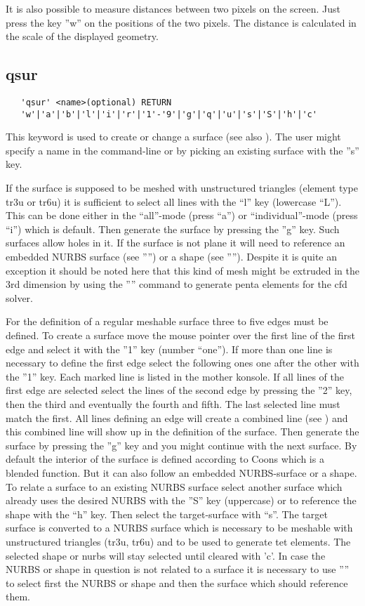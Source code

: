 \documentclass{article}
\begin{document}
It is also possible to measure distances between two pixels on the screen. Just press the key ''w'' on the positions of the two pixels. The distance is calculated in the scale of the displayed geometry.

\subsection{\label{qsur}qsur}
\begin{verbatim}
   'qsur' <name>(optional) RETURN
   'w'|'a'|'b'|'l'|'i'|'r'|'1'-'9'|'g'|'q'|'u'|'s'|'S'|'h'|'c'
\end{verbatim}
This keyword is used to create or change a surface (see also ). The user might specify a name in the command-line or by picking an existing surface with the ''s'' key.

If the surface is supposed to be meshed with unstructured triangles (element type tr3u or tr6u) it is sufficient to select all lines with the ``l'' key (lowercase ``L''). This can be done either in the ``all''-mode (press ``a'') or ``individual''-mode (press ``i'') which is default. Then generate the surface by pressing the ''g'' key. Such surfaces allow holes in it. If the surface is not plane it will need to reference an embedded NURBS surface (see '''') or a shape (see ''''). Despite it is quite an exception it should be noted here that this kind of mesh might be extruded in the 3rd dimension by using the '''' command to generate penta elements for the cfd solver.

For the definition of a regular meshable surface three to five edges must be
defined. To create a surface move the mouse pointer over the first line of the
first edge and select it with the ''1'' key (number ``one''). If more than one
line is necessary to define the first edge select the following ones one after
the other with the ''1'' key. Each marked line is listed in the mother
konsole. If all lines of the first edge are selected select the lines of the
second edge by pressing the ''2'' key, then the third and eventually the
fourth and fifth. The last selected line must match the first. All lines
defining an edge will create a combined line (see ) and
this combined line will show up in the definition of the surface. Then
generate the surface by pressing the ''g'' key and you might continue with the
next surface. By default the interior of the surface is defined according to
Coons \cite{Coons} which is a blended function. But it can also follow an
embedded NURBS-surface or a shape. To relate a surface to an existing NURBS
surface select another surface which already uses the desired NURBS with the
''S'' key (uppercase) or to reference the shape with the ``h'' key. Then
select the target-surface with ``s''. The target surface is converted to a
NURBS surface which is necessary to be meshable with unstructured triangles
(tr3u, tr6u) and to be used to generate tet elements. The selected shape or nurbs will stay selected until cleared with 'c'. In case the NURBS or shape in question is not related to a surface it is necessary to use '''' to select first the NURBS or shape and then the surface which should reference them.  
\end{document}
